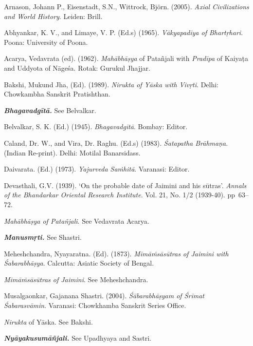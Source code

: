 \begin{thebibliography}{99}
 Arnason, Johann P., Eisenstadt, S.N., Wittrock, Björn. (2005). \textit{Axial Civilizations and World History}. Leiden: Brill. 

  Abhyankar, K. V., and Limaye, V. P. (Ed.s) (1965). \textit{Vākyapadīya of Bhartṛhari}. Poona: University of Poona.

  Acarya, Vedavrata (ed). (1962). \textit{Mahābhāṣya} of Patañjali with \textit{Pradīpa} of Kaiyaṭa and Uddyota of Nāgeśa. Rotak: Gurukul Jhajjar.

  Bakshi, Mukund Jha, (Ed). (1989). \textit{Nirukta of Yāska with Vivṛti}. Delhi: Chowkambha Sanskrit Pratishthan.

  \textbf{\textit{Bhagavadgītā.}} See Belvalkar.

  Belvalkar, S. K. (Ed.) (1945). \textit{Bhagavadgītā}. Bombay: Editor.

  Caland, Dr. W., and Vira, Dr. Raghu. (Ed.s) (1983). \textit{Śatapatha Brāhmaṇa}. (Indian Re-print). Delhi: Motilal Banarsidass.

  Daivarata. (Ed.) (1973). \textit{Yajurveda Saṁhitā}. Varanasi: Editor.

  Devasthali, G.V. (1939). ‘On the probable date of Jaimini and his sūtras’. \textit{Annals of the Bhandarkar Oriental Research Institute}. Vol. 21, No. 1/2 (1939-40). pp~63--72.

  \textit{Mahābhāṣya of Patañjali}. See Vedavrata Acarya.

  \textbf{\textit{Manusmṛti.}} See Shastri.

  Meheshchandra, Nyayaratna. (Ed). (1873). \textit{Mīmāṁsāsūtras of Jaimini with Śabarabhāṣya}. Calcutta: Asiatic Society of Bengal.

  \textit{Mīmāṁsāsūtras of Jaimini}. See Meheshchandra.

  Musalgaonkar, Gajanana Shastri. (2004). \textit{Śābarabhāṣyam of Śrīmat Śabarasvāmin}. Varanasi: Chowkhamba Sanskrit Series Office.

  \textit{Nirukta} of Yāska. See Bakshi.

  \textbf{\textit{Nyāyakusumāñjali.}} See Upadhyaya and Sastri.


\end{thebibliography}
